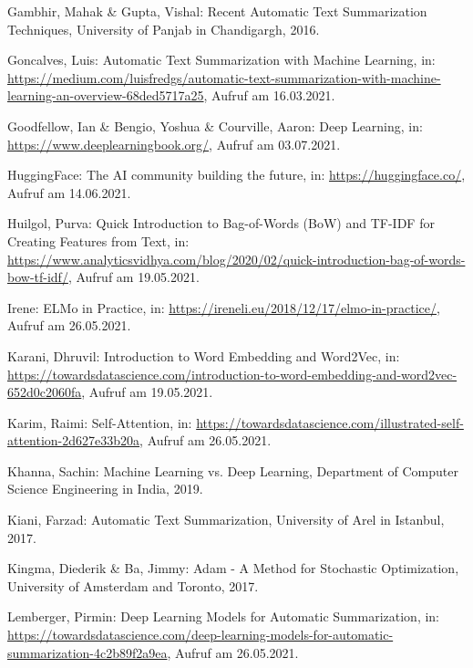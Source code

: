 \begin{thebibliography}{104}
Gambhir, Mahak \& Gupta, Vishal: Recent Automatic Text Summarization Techniques, University of Panjab in Chandigargh, 2016.

Goncalves, Luis: Automatic Text Summarization with Machine Learning, in: \url{https://medium.com/luisfredgs/automatic-text-summarization-with-machine-learning-an-overview-68ded5717a25}, Aufruf am 16.03.2021.

Goodfellow, Ian \& Bengio, Yoshua \& Courville, Aaron: Deep Learning, in: \url{https://www.deeplearningbook.org/}, Aufruf am 03.07.2021.

HuggingFace: The AI community building the future, in: \url{https://huggingface.co/}, Aufruf am 14.06.2021.

Huilgol, Purva: Quick Introduction to Bag-of-Words (BoW) and TF-IDF for Creating Features from Text, in: \url{https://www.analyticsvidhya.com/blog/2020/02/quick-introduction-bag-of-words-bow-tf-idf/}, Aufruf am 19.05.2021.

Irene: ELMo in Practice, in: \url{https://ireneli.eu/2018/12/17/elmo-in-practice/}, Aufruf am 26.05.2021.

Karani, Dhruvil: Introduction to Word Embedding and Word2Vec, in: \url{https://towardsdatascience.com/introduction-to-word-embedding-and-word2vec-652d0c2060fa}, Aufruf am 19.05.2021.

Karim, Raimi: Self-Attention, in: \url{https://towardsdatascience.com/illustrated-self-attention-2d627e33b20a}, Aufruf am 26.05.2021.

Khanna, Sachin: Machine Learning vs. Deep Learning, Department of Computer Science Engineering in India, 2019.

Kiani, Farzad: Automatic Text Summarization, University of Arel in Istanbul, 2017.

Kingma, Diederik \& Ba, Jimmy: Adam - A Method for Stochastic Optimization, University of Amsterdam and Toronto, 2017.

Lemberger, Pirmin: Deep Learning Models for Automatic Summarization, in: \url{https://towardsdatascience.com/deep-learning-models-for-automatic-summarization-4c2b89f2a9ea}, Aufruf am 26.05.2021.


\end{thebibliography}
